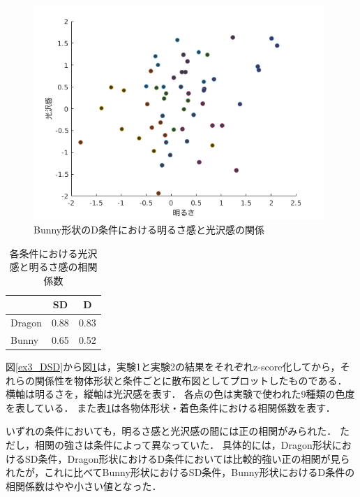             \begin{figure}[h]
                \centering
                \includegraphics[width=11.0cm]{./img/ex3_BD.png}
                \caption{Bunny形状のD条件における明るさ感と光沢感の関係}
                \label{ex3_BD}
            \end{figure}

            \begin{table}[h]
                \centering
                \caption{各条件における光沢感と明るさ感の相関係数}
                \begin{tabular}{|l||c|c|} \hline
                                & SD       & D        \\ \hline \hline
                    Dragon      & 0.88   & 0.83   \\ \hline
                    Bunny       & 0.65   & 0.52   \\ \hline
                \end{tabular}
                \label{cc}
            \end{table}

            図\ref{ex3_DSD}から図\ref{ex3_BD}は，実験1と実験2の結果をそれぞれz-score化してから，それらの関係性を物体形状と条件ごとに散布図としてプロットしたものである．
            横軸は明るさを，縦軸は光沢感を表す．
            各点の色は実験で使われた9種類の色度を表している．
            また表\ref{cc}は各物体形状・着色条件における相関係数を表す．

            いずれの条件においても，明るさ感と光沢感の間には正の相関がみられた．
            ただし，相関の強さは条件によって異なっていた．
            具体的には，Dragon形状におけるSD条件，Dragon形状におけるD条件においては比較的強い正の相関が見られたが，これに比べてBunny形状におけるSD条件，Bunny形状におけるD条件の相関係数はやや小さい値となった．
            
